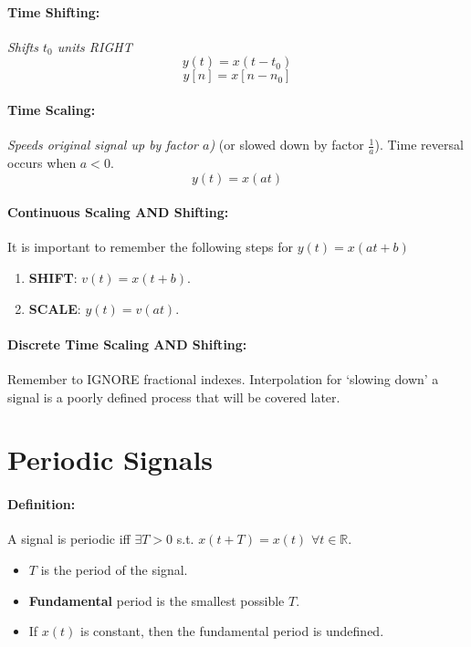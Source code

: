 \documentclass[a4paper,12pt]{report}
\def\reals{\mathbb{R}}
\begin{document}
\paragraph{Time Shifting: } \textit{Shifts $t_0$ units RIGHT}
$$y(t) = x(t-t_0)$$
$$y[n] = x[n-n_0]$$

\paragraph{Time Scaling: } \textit{Speeds original signal up by factor $a$)} (or slowed down by factor $\frac{1}{a}$). Time reversal occurs when $a<0$.
$$y(t) = x(at)$$

\paragraph{Continuous Scaling AND Shifting: } It is important to remember the following steps for $y(t) = x(at+b)$

\begin{enumerate}
\item \textbf{SHIFT}: $v(t) = x(t+b)$.
\item \textbf{SCALE}: $y(t) = v(at)$.
\end{enumerate}

\paragraph{Discrete Time Scaling AND Shifting: } Remember to IGNORE fractional indexes. Interpolation for `slowing down' a signal is a poorly defined process that will be covered later.

\section{Periodic Signals}

\paragraph{Definition: } A signal is periodic iff $\exists T > 0$ s.t. $x(t+T) = x(t)$ $\forall t\in\reals$. 

\begin{itemize}
\item $T$ is the period of the signal.
\item \textbf{Fundamental} period is the smallest possible $T$.
\item If $x(t)$ is constant, then the fundamental period is undefined.
\end{itemize}
\end{document}
